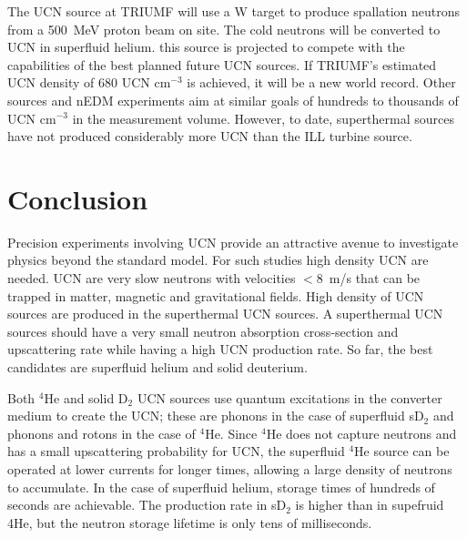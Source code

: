 The UCN source at TRIUMF will use a W target to produce spallation
neutrons from a 500~MeV proton beam on site. The cold neutrons will be
converted to UCN in superfluid helium.  this source is projected to
compete with the capabilities of the best planned future UCN
sources. If TRIUMF's estimated UCN density of 680 UCN cm$^{-3}$ is
achieved, it will be a new world record. Other sources and nEDM
experiments aim at similar goals of hundreds to thousands of UCN
cm$^{-3}$ in the measurement volume. However, to date, superthermal
sources have not produced considerably more UCN than the ILL turbine
source.



\section{Conclusion}
 
 


Precision experiments involving UCN provide an attractive avenue to
investigate physics beyond the standard model.  For such studies high
density UCN are needed. UCN are very slow neutrons with velocities
$<8$~m/s that can be trapped in matter, magnetic and gravitational
fields.  High density of UCN sources are produced in the superthermal
UCN sources. A superthermal UCN sources should have a very small
neutron absorption cross-section and upscattering rate while having a
high UCN production rate. So far, the best candidates are superfluid
helium and solid deuterium.

Both $^4$He and solid D$_2$ UCN sources use quantum excitations in the
converter medium to create the UCN; these are phonons in the case of
superfluid sD$_2$ and phonons and rotons in the case of $^4$He. Since
$^4$He does not capture neutrons and has a small upscattering
probability for UCN, the superfluid $^4$He source can be operated at
lower currents for longer times, allowing a large density of neutrons
to accumulate. In the case of superfluid helium, storage times of
hundreds of seconds are achievable. The production rate in sD$_2$ is
higher than in supefruid 4He, but the neutron storage lifetime is only
tens of milliseconds.

